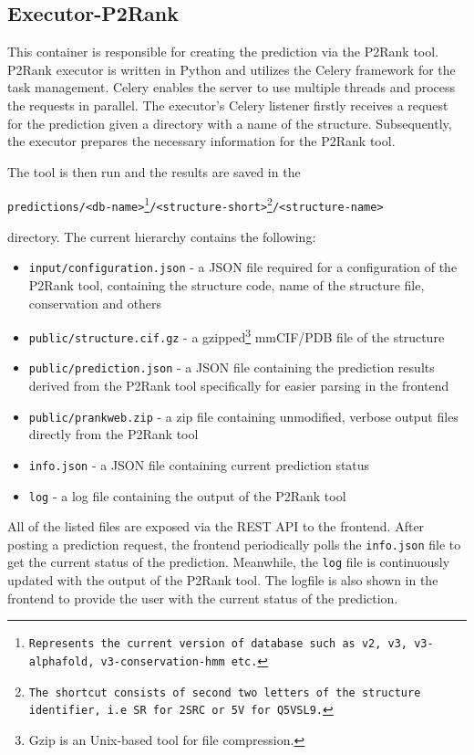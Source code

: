 \subsection{Executor-P2Rank}
\label{subsec:executor-p2rank}

This container is responsible for creating the prediction via the P2Rank tool. P2Rank executor is written in Python and utilizes the Celery framework for the task management. Celery enables the server to use multiple threads and process the requests in parallel. The executor's Celery listener firstly receives a request for the prediction given a directory with a name of the structure. Subsequently, the executor prepares the necessary information for the P2Rank tool.

The tool is then run and the results are saved in the

\texttt{predictions/<db-name>\footnote{Represents the current version of database such as v2, v3,  v3-alphafold, v3-conservation-hmm etc.}/<structure-short>\footnote{The shortcut consists of second two letters of the structure identifier, i.e \texttt{SR} for \texttt{2SRC} or \texttt{5V} for \texttt{Q5VSL9}.}/<structure-name>} 

directory. The current hierarchy contains the following:
\begin{itemize}
    \item \texttt{input/configuration.json} - a JSON file required for a configuration of the P2Rank tool, containing the structure code, name of the structure file, conservation and others
    \item \texttt{public/structure.cif.gz} - a gzipped\footnote{Gzip is an Unix-based tool for file compression.} mmCIF/PDB file of the structure
    \item \texttt{public/prediction.json} - a JSON file containing the prediction results derived from the P2Rank tool specifically for easier parsing in the frontend
    \item \texttt{public/prankweb.zip} - a zip file containing unmodified, verbose output files directly from the P2Rank tool
    \item \texttt{info.json} - a JSON file containing current prediction status
    \item \texttt{log} - a log file containing the output of the P2Rank tool
\end{itemize}

All of the listed files are exposed via the REST API to the frontend. After posting a prediction request, the frontend periodically polls the \texttt{info.json} file to get the current status of the prediction. Meanwhile, the \texttt{log} file is continuously updated with the output of the P2Rank tool. The logfile is also shown in the frontend to provide the user with the current status of the prediction.

